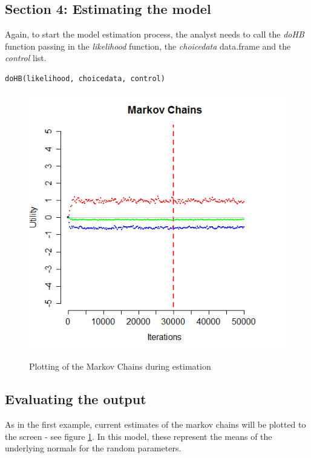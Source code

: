 \documentclass{article}\usepackage[]{graphicx}\usepackage[]{color}
\begin{document}
\subsection*{Section 4: Estimating the model}

Again, to start the model estimation process, the analyst needs to call the \emph{doHB} function passing in the \emph{likelihood} function, the \emph{choicedata} data.frame and the \emph{control} list. 

\begin{verbatim}
doHB(likelihood, choicedata, control)
\end{verbatim}

\begin{figure}
\caption{Plotting of the Markov Chains during estimation}
\includegraphics[scale=0.50]{MNL_markovChains2.png}
\label{MarkovChain2}
\end{figure}


\subsection*{Evaluating the output}

As in the first example, current estimates of the markov chains will be plotted to the screen - see figure \ref{MarkovChain2}. In this model, these represent the means of the underlying normals for the random parameters.
\end{document}
